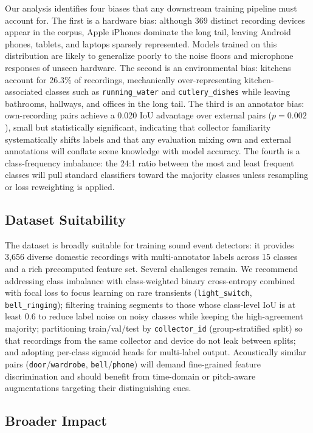 \documentclass{article}
\begin{document}
Our analysis identifies four biases that any downstream training pipeline must account for. The first is a hardware bias: although 369 distinct recording devices appear in the corpus, Apple iPhones dominate the long tail, leaving Android phones, tablets, and laptops sparsely represented. Models trained on this distribution are likely to generalize poorly to the noise floors and microphone responses of unseen hardware. The second is an environmental bias: kitchens account for 26.3\% of recordings, mechanically over-representing kitchen-associated classes such as \texttt{running\_water} and \texttt{cutlery\_dishes} while leaving bathrooms, hallways, and offices in the long tail. The third is an annotator bias: own-recording pairs achieve a 0.020 IoU advantage over external pairs ($p = 0.002$), small but statistically significant, indicating that collector familiarity systematically shifts labels and that any evaluation mixing own and external annotations will conflate scene knowledge with model accuracy. The fourth is a class-frequency imbalance: the 24:1 ratio between the most and least frequent classes will pull standard classifiers toward the majority classes unless resampling or loss reweighting is applied.

\subsection{Dataset Suitability}

The dataset is broadly suitable for training sound event detectors: it provides 3{,}656 diverse domestic recordings with multi-annotator labels across 15 classes and a rich precomputed feature set. Several challenges remain. We recommend addressing class imbalance with class-weighted binary cross-entropy combined with focal loss to focus learning on rare transients (\texttt{light\_switch}, \texttt{bell\_ringing}); filtering training segments to those whose class-level IoU is at least $0.6$ to reduce label noise on noisy classes while keeping the high-agreement majority; partitioning train/val/test by \texttt{collector\_id} (group-stratified split) so that recordings from the same collector and device do not leak between splits; and adopting per-class sigmoid heads for multi-label output. Acoustically similar pairs (\texttt{door}/\texttt{wardrobe}, \texttt{bell}/\texttt{phone}) will demand fine-grained feature discrimination and should benefit from time-domain or pitch-aware augmentations targeting their distinguishing cues.

\subsection{Broader Impact}
\end{document}

